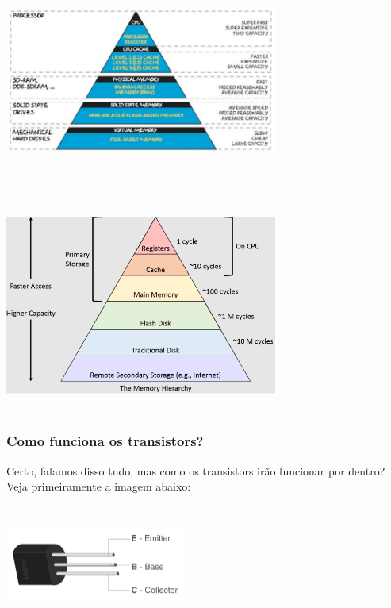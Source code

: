 \documentclass[12pt,a4paper]{report}
\begin{document}
	\begin{center}
		
		\includegraphics[width=9cm,height=7cm,keepaspectratio=false]{imagens-teoria/hierarquia_memoria2.png}
		
		\includegraphics[width=9cm,height=7cm,keepaspectratio=false]{imagens-teoria/hierarquia_memoria3.png}
	\end{center}
	

	
	
	
	\subsubsection{Como funciona os transistors?}
	Certo, falamos disso tudo, mas como os transistors irão funcionar por dentro? Veja primeiramente a imagem abaixo:
	
	\begin{center}
		
		\includegraphics[width=6cm,height=4cm,keepaspectratio=false]{imagens-teoria/transistor1.png}
		
	\end{center}
	
\end{document}
